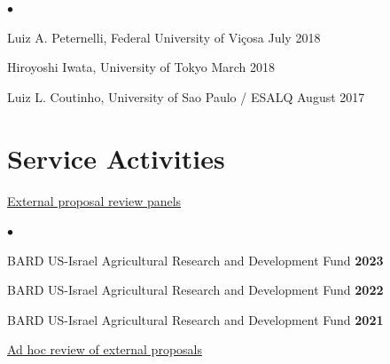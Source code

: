 \documentclass[margin,line,10pt]{res}
\newenvironment{list2}{
  \begin{list}{$\bullet$}{%
      \setlength{\itemsep}{0in}
      \setlength{\parsep}{0in} \setlength{\parskip}{0in}
      \setlength{\topsep}{0in} \setlength{\partopsep}{0in} 
      \setlength{\leftmargin}{0.2in}}}{\end{list}}
\begin{document}
\begin{resume}
\begin{list2}
\item Luiz A. Peternelli, Federal University of Vi\c cosa  \hfill July 2018\\

\item Hiroyoshi Iwata, University of Tokyo  \hfill March 2018\\
    
\item Luiz L. Coutinho, University of Sao Paulo / ESALQ  \hfill August 2017\\


\end{list2}












\vspace{0.5cm}
\section{\sc Service Activities}

\begin{flushleft}
  \hspace{0.3cm} \underline{External proposal review panels}
  \end{flushleft}


  \begin{list2}
    \item BARD US-Israel Agricultural Research and Development Fund \hfill \textbf{2023}  \\
  
    \vspace{0.3cm}

    \item BARD US-Israel Agricultural Research and Development Fund \hfill \textbf{2022}  \\
  
    \vspace{0.3cm}

    \item BARD US-Israel Agricultural Research and Development Fund \hfill \textbf{2021}  \\
  
    \end{list2}



\begin{flushleft}
\hspace{0.3cm} \underline{Ad hoc review of external proposals}
\end{flushleft}


\end{resume}
\end{document}
